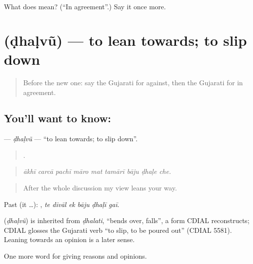 \begin{tcolorbox}[breakable,colback=teal!4,colframe=teal!35!black,title={Before you move on}]
What does  mean? (\textquotedblleft{}In agreement\textquotedblright{}.) Say it once more.
\end{tcolorbox}
\section[\texorpdfstring{\gu{ઢળવું} (ḍhaḷvũ)}{ઢળવું (ḍhaḷvũ)}]{ (ḍhaḷvũ) — to lean towards; to slip down}

\label{lesson:GU-C343-dhalvu}



\begin{quote}
Before the new one: say the Gujarati for against, then the Gujarati for in agreement.
\end{quote}

\subsection*{You'll want to know: }
\textbf{} — \emph{ḍhaḷvũ} — \textquotedblleft{}to lean towards; to slip down\textquotedblright{}.

\begin{quote}
        .
\end{quote}

\begin{quote}
\emph{ākhī carcā pachī māro mat tamārī bāju ḍhaḷe che.}
\end{quote}

\begin{quote}
After the whole discussion my view leans your way.
\end{quote}

Past (it …):      , \emph{te dīvāl ek bāju ḍhaḷī gaī}.

\begin{cousinweb}
\textbf{} (\emph{ḍhaḷvũ}) is inherited from \emph{ḍhalati}, \textquotedblleft{}bends over, falls\textquotedblright{}, a form CDIAL reconstructs; CDIAL glosses the Gujarati verb \textquotedblleft{}to slip, to be poured out\textquotedblright{} (CDIAL 5581). Leaning towards an opinion is a later sense.
\end{cousinweb}

\begin{grammarlens}[title={What you've built}]
One more word for giving reasons and opinions.
\end{grammarlens}

